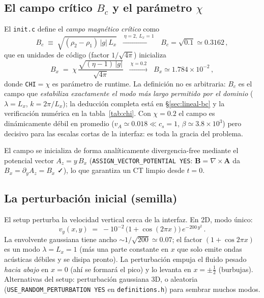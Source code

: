\documentclass[11pt,a4paper]{article}
\newcommand{\B}{\mathbf{B}}
\newcommand{\code}[1]{\texttt{#1}}
\begin{document}
\subsection{El campo crítico \texorpdfstring{$B_c$}{Bc} y el parámetro \texorpdfstring{$\chi$}{chi}}
\label{sec:setup-Bc}

El \code{init.c} define el \emph{campo magnético crítico} como
\begin{equation}
B_c \;\equiv\; \sqrt{(\rho_2-\rho_1)\,|g|\,L_x}
\;\;\xrightarrow{\ \eta=2,\ L_x=1\ }\;\;
B_c=\sqrt{0.1}\simeq 0.3162\,,
\end{equation}
que en unidades de código (factor $1/\sqrt{4\pi}$) inicializa
\begin{equation}
B_x \;=\; \chi\,\frac{\sqrt{(\eta-1)\,|g|}}{\sqrt{4\pi}}
\;\;\xrightarrow{\ \chi=0.2\ }\;\; B_x \simeq 1.784\times 10^{-2}\,,
\label{eq:bchi}
\end{equation}
donde \code{CHI}$=\chi$ es parámetro de runtime. La definición no es arbitraria: $B_c$ es el
campo que \emph{estabiliza exactamente el modo más largo permitido por el dominio}
($\lambda=L_x$, $k=2\pi/L_x$); la deducción completa está en \S\ref{sec:lineal-bc} y la
verificación numérica en la tabla~\ref{tab:chi}. Con $\chi=0.2$ el campo es dinámicamente
débil en promedio ($v_A\simeq 0.018\ll c_s=1$, $\beta\simeq 3.8\times10^3$) pero decisivo
para las escalas cortas de la interfaz: es toda la gracia del problema.

El campo se inicializa de forma analíticamente divergencia-free mediante el potencial vector
$A_z = y\,B_x$ (\code{ASSIGN\_VECTOR\_POTENTIAL YES}: $\B=\nabla\times\mathbf{A}$ da
$B_x=\partial_y A_z = B_x$ ✓), lo que garantiza un CT limpio desde $t=0$.

\subsection{La perturbación inicial (semilla)}

El setup perturba la velocidad vertical cerca de la interfaz. En 2D, modo único:
\begin{equation}
v_y(x,y) \;=\; -10^{-2}\,\big(1+\cos(2\pi x)\big)\,e^{-200\,y^2}\,.
\label{eq:semilla}
\end{equation}
La envolvente gaussiana tiene ancho $\sim 1/\sqrt{200}\simeq 0.07$; el factor
$(1+\cos 2\pi x)$ es un modo $\lambda=L_x=1$ (más una parte constante en $x$ que solo emite
ondas acústicas débiles y se disipa pronto). La perturbación empuja el fluido pesado
\emph{hacia abajo} en $x=0$ (ahí se formará el pico) y lo levanta en $x=\pm\tfrac12$
(burbujas). Alternativas del setup: perturbación gaussiana 3D, o aleatoria
(\code{USE\_RANDOM\_PERTURBATION YES} en \code{definitions.h}) para sembrar muchos modos.
\end{document}
